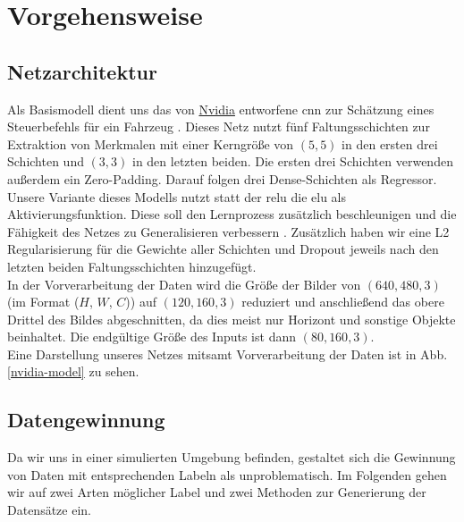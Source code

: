 \chapter{Vorgehensweise}

\section{Netzarchitektur}

Als Basismodell dient uns das von \href{https://www.nvidia.com/en-us/}{Nvidia} entworfene \acs{cnn} zur Schätzung eines Steuerbefehls für ein Fahrzeug \cite{nvidia}. Dieses Netz nutzt fünf Faltungsschichten zur Extraktion von Merkmalen mit einer Kerngröße von $(5, 5)$ in den ersten drei Schichten und $(3, 3)$ in den letzten beiden. Die ersten drei Schichten verwenden außerdem ein Zero-Padding. Darauf folgen drei Dense-Schichten als Regressor. \\

Unsere Variante dieses Modells nutzt statt der \acs{relu} die \acs{elu} als Aktivierungsfunktion. Diese soll den Lernprozess zusätzlich beschleunigen und die Fähigkeit des Netzes zu Generalisieren verbessern \cite{elu}. Zusätzlich haben wir eine L2 Regularisierung für die Gewichte aller Schichten und Dropout jeweils nach den letzten beiden Faltungsschichten hinzugefügt. \\

In der Vorverarbeitung der Daten wird die Größe der Bilder von $(640, 480, 3)$ (im Format ($H$, $W$, $C$)) auf $(120, 160, 3)$ reduziert und anschließend das obere Drittel des Bildes abgeschnitten, da dies meist nur Horizont und sonstige Objekte beinhaltet. Die endgültige Größe des Inputs ist dann $(80, 160, 3)$. \\

Eine Darstellung unseres Netzes mitsamt Vorverarbeitung der Daten ist in Abb. \ref{nvidia-model} zu sehen.

\section{Datengewinnung}

Da wir uns in einer simulierten Umgebung befinden, gestaltet sich die Gewinnung von Daten mit entsprechenden Labeln als unproblematisch.
Im Folgenden gehen wir auf zwei Arten möglicher Label und zwei Methoden zur Generierung der Datensätze ein.


